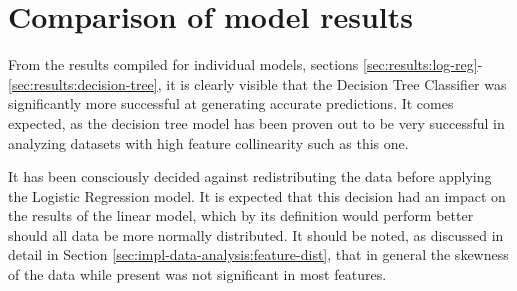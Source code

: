 \section{Comparison of model results}
From the results compiled for individual models, sections \ref{sec:results:log-reg}-\ref{sec:results:decision-tree}, it is clearly visible that the Decision Tree Classifier was significantly more successful at generating accurate predictions. It comes expected, as the decision tree model has been proven out to be very successful in analyzing datasets with high feature collinearity \cite{Bertsimas2017Cart} such as this one. 

It has been consciously decided against redistributing the data before applying the Logistic Regression model. It is expected that this decision had an impact on the results of the linear model, which by its definition would perform better should all data be more normally distributed. It should be noted, as discussed in detail in Section \ref{sec:impl-data-analysis:feature-dist}, that in general the skewness of the data while present was not significant in most features.